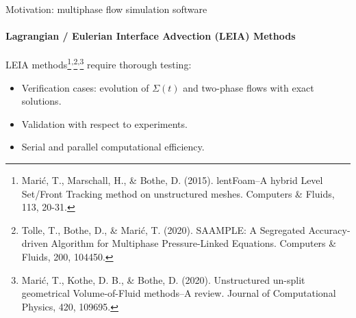 \documentclass[
	aspectratio=169,%
	color={accentcolor=2d},
	logo=true,%
	colorframetitle=true,%
	]{tudabeamer}
\begin{document}
\begin{frame}{Motivation: multiphase flow simulation software}
    \framesubtitle{Lagrangian / Eulerian Interface Advection (LEIA) Methods}

    \vfill
    LEIA methods\footnote{Marić, T., Marschall, H., \& Bothe, D. (2015). lentFoam–A hybrid Level Set/Front Tracking method on unstructured meshes. Computers \& Fluids, 113, 20-31.}\textsuperscript{,}\footnote{\footnotesize Tolle, T., Bothe, D., \& Marić, T. (2020). SAAMPLE: A Segregated Accuracy-driven Algorithm for Multiphase Pressure-Linked Equations. Computers \& Fluids, 200, 104450.}\textsuperscript{,}\footnote{Marić, T., Kothe, D. B., \& Bothe, D. (2020). Unstructured un-split geometrical Volume-of-Fluid methods–A review. Journal of Computational Physics, 420, 109695.} require thorough testing: 
    \begin{itemize}
        \item Verification cases: evolution of $\Sigma(t)$ and two-phase flows with exact solutions. 

        \item Validation with respect to experiments.  

        \item Serial and parallel computational efficiency. 
    \end{itemize}

\end{frame}



\end{document}
